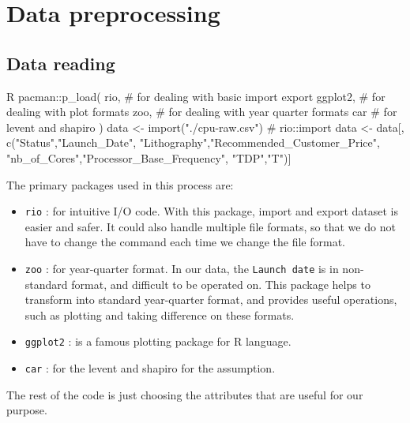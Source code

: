 %
%   
\section{Data preprocessing}



\subsection{Data reading}

\begin{code}{R}
pacman::p_load(
    rio,     # for dealing with basic import export
    ggplot2, # for dealing with plot formats
    zoo,      # for dealing with year quarter formats
    car     # for levent and shapiro
)
data <- import("./cpu-raw.csv") # rio::import
data <- data[, c("Status","Launch_Date",
         "Lithography","Recommended_Customer_Price",
         "nb_of_Cores","Processor_Base_Frequency",
                 "TDP","T")] 
\end{code}

The primary packages used in this process are:

\begin{itemize}
    \item \verb|rio| : for intuitive I/O code.
    With this package, import and export dataset is easier and safer. It could 
    also handle multiple file formats, so that we do not have to
    change the command each time we change the file format.

    \item \verb|zoo| : for year-quarter format.
    In our data, the \verb|Launch date| is in non-standard format, and difficult to be operated on. This package helps to transform
    into standard year-quarter format, and provides useful operations, such as plotting and taking difference on these formats.

    \item \verb|ggplot2| : is a famous plotting package for R language.

    \item \verb|car| : for the levent and shapiro for the assumption.
\end{itemize}

The rest of the code is just choosing the attributes that are useful for our purpose.

